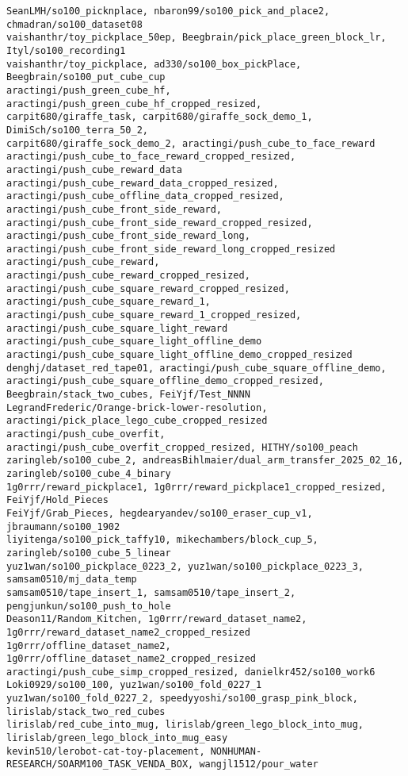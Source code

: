 \begin{verbatim}
SeanLMH/so100_picknplace, nbaron99/so100_pick_and_place2, chmadran/so100_dataset08
vaishanthr/toy_pickplace_50ep, Beegbrain/pick_place_green_block_lr, Ityl/so100_recording1
vaishanthr/toy_pickplace, ad330/so100_box_pickPlace, Beegbrain/so100_put_cube_cup
aractingi/push_green_cube_hf, aractingi/push_green_cube_hf_cropped_resized, 
carpit680/giraffe_task, carpit680/giraffe_sock_demo_1, DimiSch/so100_terra_50_2, 
carpit680/giraffe_sock_demo_2, aractingi/push_cube_to_face_reward 
aractingi/push_cube_to_face_reward_cropped_resized, aractingi/push_cube_reward_data
aractingi/push_cube_reward_data_cropped_resized, aractingi/push_cube_offline_data_cropped_resized, 
aractingi/push_cube_front_side_reward, aractingi/push_cube_front_side_reward_cropped_resized, 
aractingi/push_cube_front_side_reward_long, aractingi/push_cube_front_side_reward_long_cropped_resized
aractingi/push_cube_reward, aractingi/push_cube_reward_cropped_resized, 
aractingi/push_cube_square_reward_cropped_resized, aractingi/push_cube_square_reward_1, 
aractingi/push_cube_square_reward_1_cropped_resized, aractingi/push_cube_square_light_reward
aractingi/push_cube_square_light_offline_demo
aractingi/push_cube_square_light_offline_demo_cropped_resized
denghj/dataset_red_tape01, aractingi/push_cube_square_offline_demo, 
aractingi/push_cube_square_offline_demo_cropped_resized, Beegbrain/stack_two_cubes, FeiYjf/Test_NNNN
LegrandFrederic/Orange-brick-lower-resolution, aractingi/pick_place_lego_cube_cropped_resized
aractingi/push_cube_overfit, aractingi/push_cube_overfit_cropped_resized, HITHY/so100_peach
zaringleb/so100_cube_2, andreasBihlmaier/dual_arm_transfer_2025_02_16, zaringleb/so100_cube_4_binary
1g0rrr/reward_pickplace1, 1g0rrr/reward_pickplace1_cropped_resized, FeiYjf/Hold_Pieces
FeiYjf/Grab_Pieces, hegdearyandev/so100_eraser_cup_v1, jbraumann/so100_1902
liyitenga/so100_pick_taffy10, mikechambers/block_cup_5, zaringleb/so100_cube_5_linear
yuz1wan/so100_pickplace_0223_2, yuz1wan/so100_pickplace_0223_3, samsam0510/mj_data_temp
samsam0510/tape_insert_1, samsam0510/tape_insert_2, pengjunkun/so100_push_to_hole
Deason11/Random_Kitchen, 1g0rrr/reward_dataset_name2, 1g0rrr/reward_dataset_name2_cropped_resized
1g0rrr/offline_dataset_name2, 1g0rrr/offline_dataset_name2_cropped_resized
aractingi/push_cube_simp_cropped_resized, danielkr452/so100_work6
Loki0929/so100_100, yuz1wan/so100_fold_0227_1
yuz1wan/so100_fold_0227_2, speedyyoshi/so100_grasp_pink_block, lirislab/stack_two_red_cubes
lirislab/red_cube_into_mug, lirislab/green_lego_block_into_mug, lirislab/green_lego_block_into_mug_easy
kevin510/lerobot-cat-toy-placement, NONHUMAN-RESEARCH/SOARM100_TASK_VENDA_BOX, wangjl1512/pour_water

\end{verbatim}
